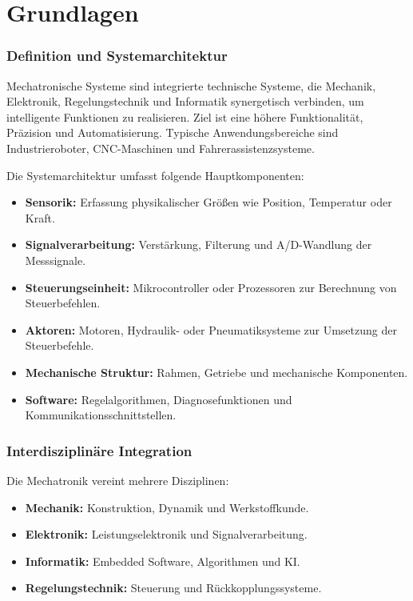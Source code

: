 \chapter{Grundlagen}
\label{cha:Grundlagen}

\subsection{Definition und Systemarchitektur}
\label{cha:Definition und Systemarchitektur}

Mechatronische Systeme sind integrierte technische Systeme, die Mechanik, Elektronik, Regelungstechnik und Informatik synergetisch verbinden, um intelligente Funktionen zu realisieren. Ziel ist eine höhere Funktionalität, Präzision und Automatisierung. \autocite{hering2015tb} Typische Anwendungsbereiche sind Industrieroboter, CNC-Maschinen und Fahrerassistenzsysteme.\autocite{UNBEHAUEN1998145}

Die Systemarchitektur umfasst folgende Hauptkomponenten:
\begin{itemize}
	\item \textbf{Sensorik:} Erfassung physikalischer Größen wie Position, Temperatur oder Kraft.
	\item \textbf{Signalverarbeitung:} Verstärkung, Filterung und A/D-Wandlung der Messsignale.
	\item \textbf{Steuerungseinheit:} Mikrocontroller oder Prozessoren zur Berechnung von Steuerbefehlen.
	\item \textbf{Aktoren:} Motoren, Hydraulik- oder Pneumatiksysteme zur Umsetzung der Steuerbefehle.
	\item \textbf{Mechanische Struktur:} Rahmen, Getriebe und mechanische Komponenten.
	\item \textbf{Software:} Regelalgorithmen, Diagnosefunktionen und Kommunikationsschnittstellen.
\end{itemize}

\subsection{Interdisziplinäre Integration}
\label{cha:Interdisziplinäre Integration}

Die Mechatronik vereint mehrere Disziplinen:
\begin{itemize}
	\item \textbf{Mechanik:} Konstruktion, Dynamik und Werkstoffkunde.
	\item \textbf{Elektronik:} Leistungselektronik und Signalverarbeitung.
	\item \textbf{Informatik:} Embedded Software, Algorithmen und KI.
	\item \textbf{Regelungstechnik:} Steuerung und Rückkopplungssysteme.
\end{itemize}

